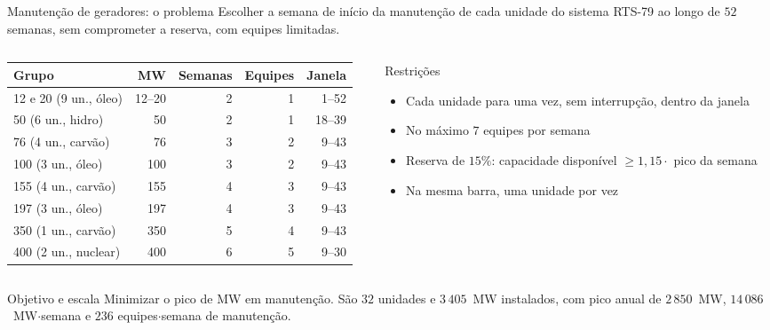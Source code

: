 \documentclass[10pt,aspectratio=169]{beamer}
\begin{document}
\begin{frame}{Manutenção de geradores: o problema}
  \small
  Escolher a semana de início da manutenção de cada unidade do sistema
  \alert{RTS-79} ao longo de $52$ semanas, sem comprometer a reserva, com
  equipes limitadas.

  \vspace{0.4em}
  \begin{columns}[T]
    \begin{column}{0.54\textwidth}
      \centering\scriptsize
      \begin{tabular}{lrrrr}
        \toprule
        Grupo & MW & Semanas & Equipes & Janela \\
        \midrule
        12 e 20 (9 un., óleo)  & 12--20 & 2 & 1 & 1--52 \\
        50 (6 un., hidro)      & 50     & 2 & 1 & 18--39 \\
        76 (4 un., carvão)     & 76     & 3 & 2 & 9--43 \\
        100 (3 un., óleo)      & 100    & 3 & 2 & 9--43 \\
        155 (4 un., carvão)    & 155    & 4 & 3 & 9--43 \\
        197 (3 un., óleo)      & 197    & 4 & 3 & 9--43 \\
        350 (1 un., carvão)    & 350    & 5 & 4 & 9--43 \\
        400 (2 un., nuclear)   & 400    & 6 & 5 & 9--30 \\
        \bottomrule
      \end{tabular}
    \end{column}
    \begin{column}{0.44\textwidth}
      \begin{block}{Restrições}
        \footnotesize
        \begin{itemize}\itemsep1pt
          \item Cada unidade para uma vez, sem interrupção, dentro da janela
          \item No máximo \alert{$7$ equipes} por semana
          \item Reserva de \alert{$15\%$}: capacidade disponível $\ge 1{,}15 \cdot$ pico da semana
          \item Na mesma barra, uma unidade por vez
        \end{itemize}
      \end{block}
    \end{column}
  \end{columns}

  \vspace{0.5em}
  \begin{block}{Objetivo e escala}
    \footnotesize
    Minimizar o \alert{pico de MW em manutenção}. São $32$ unidades e $3\,405$~MW
    instalados, com pico anual de $2\,850$~MW, $14\,086$~MW$\cdot$semana e
    $236$ equipes$\cdot$semana de manutenção.
  \end{block}
\end{frame}
\end{document}
